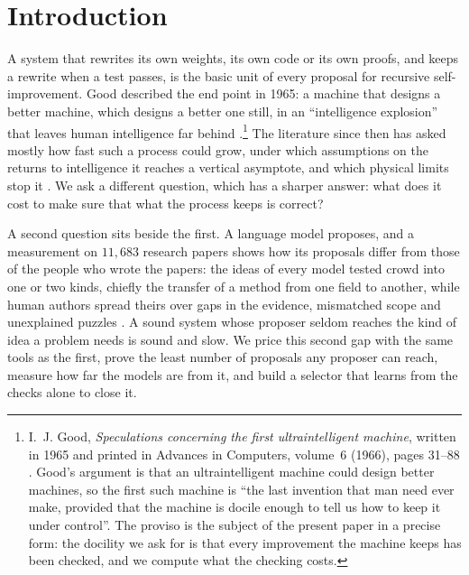 \section{Introduction}\label{sec:intro}

A system that rewrites its own weights, its own code or its own proofs, and keeps a rewrite when a test passes, is the basic unit of every proposal for recursive self-improvement. Good described the end point in 1965: a machine that designs a better machine, which designs a better one still, in an ``intelligence explosion'' that leaves human intelligence far behind \cite{Goo66}.\footnote{I.~J. Good, \emph{Speculations concerning the first ultraintelligent machine}, written in 1965 and printed in Advances in Computers, volume~6 (1966), pages 31--88 \cite{Goo66}. Good's argument is that an ultraintelligent machine could design better machines, so the first such machine is ``the last invention that man need ever make, provided that the machine is docile enough to tell us how to keep it under control''. The proviso is the subject of the present paper in a precise form: the docility we ask for is that every improvement the machine keeps has been checked, and we compute what the checking costs.} The literature since then has asked mostly how fast such a process could grow, under which assumptions on the returns to intelligence it reaches a vertical asymptote, and which physical limits stop it \cite{Ord26,AOA25}. We ask a different question, which has a sharper answer: what does it cost to make sure that what the process keeps is correct?

A second question sits beside the first. A language model proposes, and a measurement on $11{,}683$ research papers shows how its proposals differ from those of the people who wrote the papers: the ideas of every model tested crowd into one or two kinds, chiefly the transfer of a method from one field to another, while human authors spread theirs over gaps in the evidence, mismatched scope and unexplained puzzles \cite{CZC26}. A sound system whose proposer seldom reaches the kind of idea a problem needs is sound and slow. We price this second gap with the same tools as the first, prove the least number of proposals any proposer can reach, measure how far the models are from it, and build a selector that learns from the checks alone to close it.

